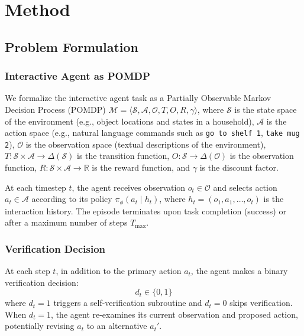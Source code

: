 
\section{Method}
\label{sec:method}

\subsection{Problem Formulation}
\label{subsec:problem-formulation}

\subsubsection{Interactive Agent as POMDP}

We formalize the interactive agent task as a Partially Observable Markov Decision Process (POMDP) $\mathcal{M} = \langle \mathcal{S}, \mathcal{A}, \mathcal{O}, T, O, R, \gamma \rangle$, where $\mathcal{S}$ is the state space of the environment (e.g., object locations and states in a household), $\mathcal{A}$ is the action space (e.g., natural language commands such as \texttt{go to shelf 1}, \texttt{take mug 2}), $\mathcal{O}$ is the observation space (textual descriptions of the environment), $T: \mathcal{S} \times \mathcal{A} \rightarrow \Delta(\mathcal{S})$ is the transition function, $O: \mathcal{S} \rightarrow \Delta(\mathcal{O})$ is the observation function, $R: \mathcal{S} \times \mathcal{A} \rightarrow \mathbb{R}$ is the reward function, and $\gamma$ is the discount factor.

At each timestep $t$, the agent receives observation $o_t \in \mathcal{O}$ and selects action $a_t \in \mathcal{A}$ according to its policy $\pi_\phi(a_t \mid h_t)$, where $h_t = (o_1, a_1, \ldots, o_t)$ is the interaction history. The episode terminates upon task completion (success) or after a maximum number of steps $T_{\max}$.

\subsubsection{Verification Decision}

At each step $t$, in addition to the primary action $a_t$, the agent makes a binary verification decision:
\begin{equation}
d_t \in \{0, 1\}
\label{eq:verify-decision}
\end{equation}
where $d_t = 1$ triggers a self-verification subroutine and $d_t = 0$ skips verification. When $d_t = 1$, the agent re-examines its current observation and proposed action, potentially revising $a_t$ to an alternative $a_t'$.

